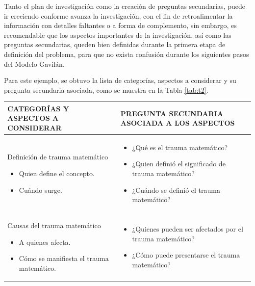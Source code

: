 Tanto el plan de investigación como la creación de preguntas secundarias, puede ir creciendo conforme avanza la investigación, con el fin de retroalimentar la información con detalles faltantes o a forma de complemento, sin embargo, es recomendable que los aspectos importantes de la investigación, así como las preguntas secundarias, queden bien definidas durante la primera etapa de definición del problema, para que no exista confusión durante los siguientes pasos del Modelo Gavilán.

Para este ejemplo, se obtuvo la lista de categorías, aspectos a considerar y su pregunta secundaria asociada, como se muestra en la Tabla \ref{tab:t2}.

\begin{table}[H]
  \begin{center}
    \begin{tabular}{ | p{8cm} | p{8cm} | }
      \hline
      CATEGORÍAS Y ASPECTOS A CONSIDERAR & PREGUNTA SECUNDARIA ASOCIADA A LOS ASPECTOS \\ \hline
      Definición de trauma matemático
      \begin{itemize}
        \item Quien define el concepto.
        \item Cuándo surge.
      \end{itemize} & 
      \begin{itemize}
        \item ¿Qué es el trauma matemático?
        \item ¿Quien definió el significado de trauma matemático?
        \item ¿Cuándo se definió el trauma matemático?
      \end{itemize} \\ \hline

      Causas del trauma matemático
      \begin{itemize}
        \item A quienes afecta.
        \item Cómo se manifiesta el trauma matemático.
      \end{itemize} & 
      \begin{itemize}
        \item ¿Quienes pueden ser afectados por el trauma matemático?
        \item ¿Cómo puede presentarse el trauma matemático?
      \end{itemize} \\ \hline


\end{tabular}
\end{center}
\end{table}
